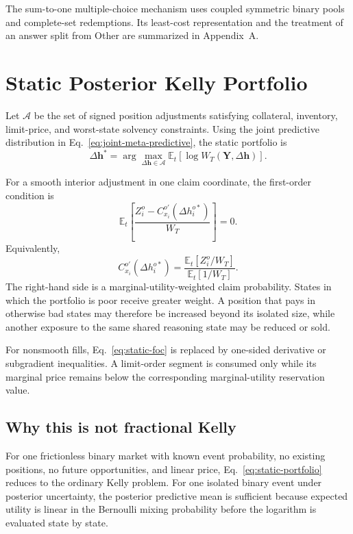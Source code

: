 \documentclass[journal,a4paper]{IEEEtran}
\newcommand{\E}{\mathbb{E}}
\begin{document}
The sum-to-one multiple-choice mechanism uses coupled symmetric binary pools and complete-set redemptions. Its least-cost representation and the treatment of an answer split from Other are summarized in Appendix~A.

\section{Static Posterior Kelly Portfolio}
Let $\mathcal{A}$ be the set of signed position adjustments satisfying collateral, inventory, limit-price, and worst-state solvency constraints. Using the joint predictive distribution in Eq.~\eqref{eq:joint-meta-predictive}, the static portfolio is
\begin{equation}
\Delta\boldsymbol{h}^{*}
=
\arg\max_{\Delta\boldsymbol{h}\in\mathcal{A}}
\E_t\!\left[
\log W_T(\boldsymbol{Y},\Delta\boldsymbol{h})
\right].
\label{eq:static-portfolio}
\end{equation}

For a smooth interior adjustment in one claim coordinate, the first-order condition is
\begin{equation}
\E_t\!\left[
\frac{Z_i^o-C_{x_i}^{o\prime}(\Delta h_i^{o*})}
{W_T}
\right]
=0.
\label{eq:static-foc}
\end{equation}
Equivalently,
\begin{equation}
C_{x_i}^{o\prime}(\Delta h_i^{o*})
=
\frac{\E_t[Z_i^o/W_T]}{\E_t[1/W_T]}.
\label{eq:mu-weighted-probability}
\end{equation}
The right-hand side is a marginal-utility-weighted claim probability. States in which the portfolio is poor receive greater weight. A position that pays in otherwise bad states may therefore be increased beyond its isolated size, while another exposure to the same shared reasoning state may be reduced or sold.

For nonsmooth fills, Eq.~\eqref{eq:static-foc} is replaced by one-sided derivative or subgradient inequalities. A limit-order segment is consumed only while its marginal price remains below the corresponding marginal-utility reservation value.

\subsection{Why this is not fractional Kelly}
For one frictionless binary market with known event probability, no existing positions, no future opportunities, and linear price, Eq.~\eqref{eq:static-portfolio} reduces to the ordinary Kelly problem. For one isolated binary event under posterior uncertainty, the posterior predictive mean is sufficient because expected utility is linear in the Bernoulli mixing probability before the logarithm is evaluated state by state.
\end{document}
